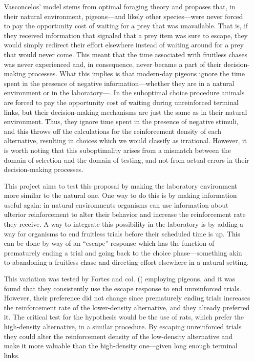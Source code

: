 \documentclass[a4paper,12pt]{article}
\begin{document}
Vasconcelos' model stems from optimal foraging theory and proposes that, in their natural environment, pigeons---and likely other species---were never forced to pay the opportunity cost of waiting for a prey that was unavailable. That is, if they received information that signaled that a prey item was sure to escape, they would simply redirect their effort elsewhere instead of waiting around for a prey that would never come. This meant that the time associated with fruitless chases was never experienced and, in consequence, never became a part of their decision-making processes. What this implies is that modern-day pigeons ignore the time spent in the presence of negative information---whether they are in a natural environment or in the laboratory---. In the suboptimal choice procedure animals are forced to pay the opportunity cost of waiting during unreinforced terminal links, but their decision-making mechanisms are just the same as in their natural environment. Thus, they ignore time spent in the presence of negative stimuli, and this throws off the calculations for the reinforcement density of each alternative, resulting in choices which we would classify as irrational. However, it is worth noting that this suboptimality arises from a mismatch between the domain of selection and the domain of testing, and not from actual errors in their decision-making processes.

This project aims to test this proposal by making the laboratory environment more similar to the natural one. One way to do this is by making information useful again: in natural environments organisms can use information about ulterior reinforcement to alter their behavior and increase the reinforcement rate they receive. A way to integrate this possibility in the laboratory is by adding a way for organisms to end fruitless trials before their scheduled time is up. This can be done by way of an ``escape'' response which has the function of prematurely ending a trial and going back to the choice phase---something akin to abandoning a fruitless chase and directing effort elsewhere in a natural setting.

This variation was tested by Fortes and col. (\citeyear{Fortes2017}) employing pigeons, and it was found that they consistently use the escape response to end unreinforced trials. However, their preference did not change since prematurely ending trials increases the reinforcement rate of the lower-density alternative, and they already preferred it. The critical test for the hypothesis would be the use of rats, which prefer the high-density alternative, in a similar procedure. By escaping unreinforced trials they could alter the reinforcement density of the low-density alternative and make it more valuable than the high-density one---given long enough terminal links.
\end{document}
